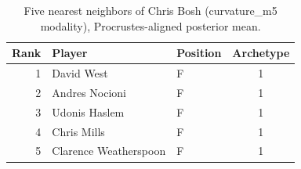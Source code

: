 \begin{table}[htbp]
  \centering\small
  \begin{tabular}{rllc}
    \toprule
    Rank & Player & Position & Archetype \\
    \midrule
    1 & David West & F & 1 \\
    2 & Andres Nocioni & F & 1 \\
    3 & Udonis Haslem & F & 1 \\
    4 & Chris Mills & F & 1 \\
    5 & Clarence Weatherspoon & F & 1 \\
    \bottomrule
  \end{tabular}
  \caption{Five nearest neighbors of Chris Bosh (curvature_m5 modality), Procrustes-aligned posterior mean.}
  \label{tab:Chris_Bosh_neighbors_curvature_m5}
\end{table}

